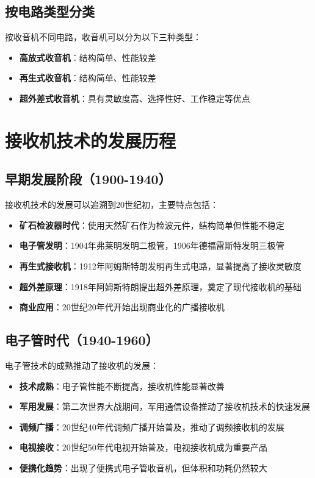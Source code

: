 \documentclass[12pt,UTF8]{ctexbook}
\begin{document}
\subsection{按电路类型分类}

按收音机不同电路，收音机可以分为以下三种类型：

\begin{itemize}[leftmargin=3.5em]
    \item \textbf{高放式收音机}：结构简单、性能较差
    \item \textbf{再生式收音机}：结构简单、性能较差
    \item \textbf{超外差式收音机}：具有灵敏度高、选择性好、工作稳定等优点
\end{itemize}

\section{接收机技术的发展历程}

\subsection{早期发展阶段（1900-1940）}

接收机技术的发展可以追溯到20世纪初，主要特点包括：

\begin{itemize}[leftmargin=3.5em]
    \item \textbf{矿石检波器时代}：使用天然矿石作为检波元件，结构简单但性能不稳定
    \item \textbf{电子管发明}：1904年弗莱明发明二极管，1906年德福雷斯特发明三极管
    \item \textbf{再生式接收机}：1912年阿姆斯特朗发明再生式电路，显著提高了接收灵敏度
    \item \textbf{超外差原理}：1918年阿姆斯特朗提出超外差原理，奠定了现代接收机的基础
    \item \textbf{商业应用}：20世纪20年代开始出现商业化的广播接收机
\end{itemize}

\subsection{电子管时代（1940-1960）}

电子管技术的成熟推动了接收机的发展：

\begin{itemize}[leftmargin=3.5em]
    \item \textbf{技术成熟}：电子管性能不断提高，接收机性能显著改善
    \item \textbf{军用发展}：第二次世界大战期间，军用通信设备推动了接收机技术的快速发展
    \item \textbf{调频广播}：20世纪40年代调频广播开始普及，推动了调频接收机的发展
    \item \textbf{电视接收}：20世纪50年代电视开始普及，电视接收机成为重要产品
    \item \textbf{便携化趋势}：出现了便携式电子管收音机，但体积和功耗仍然较大
\end{itemize}
\end{document}

